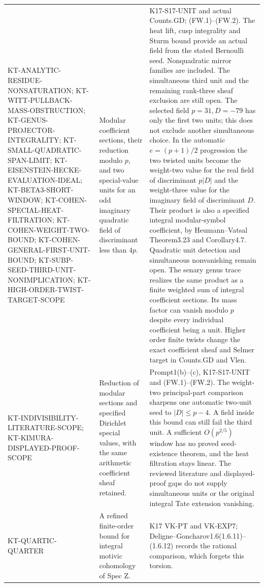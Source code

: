 \documentclass[11pt,a4paper]{article}
\theoremstyle{definition}
\begin{document}
\begin{longtable}{>{\raggedright\arraybackslash}p{}
>{\raggedright\arraybackslash}p{}
>{\raggedright\arraybackslash}p{}}
KT-ANALYTIC-RESIDUE-NONSATURATION;
KT-WITT-PULLBACK-MASS-OBSTRUCTION;
KT-GENUS-PROJECTOR-INTEGRALITY;
KT-SMALL-QUADRATIC-SPAN-LIMIT;
KT-EISENSTEIN-HECKE-EVALUATION-IDEAL;
KT-BETA3-SHORT-WINDOW;
KT-COHEN-SPECIAL-HEAT-FILTRATION;
KT-COHEN-WEIGHT-TWO-BOUND;
KT-COHEN-GENERAL-FIRST-UNIT-BOUND;
KT-SUBP-SEED-THIRD-UNIT-NONIMPLICATION;
KT-HIGH-ORDER-TWIST-TARGET-SCOPE &
Modular coefficient sections, their reduction modulo $p$,
and two special-value units for an odd imaginary quadratic
field of discriminant less than $4p$. &
K17-S17-UNIT and actual Counts.GD; (FW.1)--(FW.2).
The heat lift, cusp integrality and Sturm bound provide an
actual field from the stated Bernoulli seed. Nonquadratic
mirror families are included. The simultaneous third unit
and the remaining rank-three sheaf exclusion are still open.
The selected field $p=31,D=-79$ has only the first two units;
this does not exclude another simultaneous choice. In the
automatic $e=(p+1)/2$ progression the two twisted units become
the weight-two value for the real field of discriminant $p|D|$
and the weight-three value for the imaginary field of
discriminant $D$. Their product is also a specified integral modular-symbol coefficient,
by Heumann--Vatsal Theorem3.23 and Corollary4.7. Quadratic
unit detection and simultaneous nonvanishing remain open.
The senary genus trace realizes the same product as a finite
weighted sum of integral coefficient sections. Its mass factor
can vanish modulo $p$ despite every individual coefficient being
a unit. Higher order finite twists change the exact coefficient
sheaf and Selmer target in Counts.GD and Vlen.\\
KT-INDIVISIBILITY-LITERATURE-SCOPE;
KT-KIMURA-DISPLAYED-PROOF-SCOPE &
Reduction of modular sections and specified Dirichlet special values,
with the same arithmetic coefficient sheaf retained. &
Prompt1(b)--(c), K17-S17-UNIT and (FW.1)--(FW.2).
The weight-two principal-part comparison sharpens one automatic
two-unit seed to $|D|\leq p-4$. A field inside this bound can still
fail the third unit. A sufficient $O(p^{2/5})$ window has no proved
seed-existence theorem, and the heat filtration stays linear.
The reviewed literature and displayed-proof gaps do not supply
simultaneous units or the original integral Tate extension vanishing.\\
KT-QUARTIC-QUARTER &
A refined finite-order bound for integral motivic cohomology
of Spec Z. &
K17 VK-PT and VK-EXP7; Deligne--Goncharov1.6(1.6.11)--(1.6.12)
records the rational comparison, which forgets this torsion.\\

\end{longtable}
\end{document}
